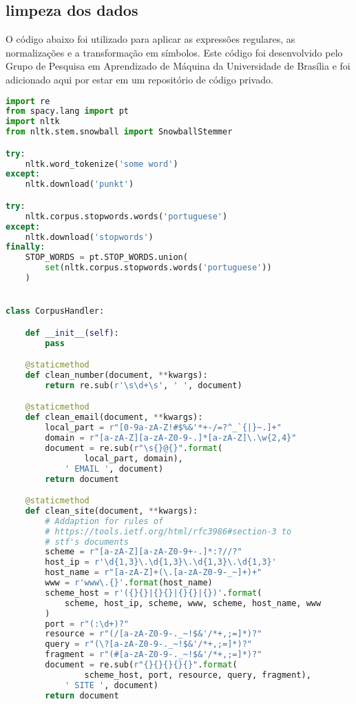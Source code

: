 \begin{apendicesenv}

\partapendices
\chapter{limpeza dos dados}
\label{sec:apendiceA}

O código abaixo foi utilizado para aplicar as expressões regulares, as normalizações e a transformação em símbolos. Este código foi desenvolvido pelo Grupo de Pesquisa em Aprendizado de Máquina da Universidade de Brasília e foi adicionado aqui por estar em um repositório de código privado.

\begin{lstlisting}[language=Python,extendedchars=true]
import re
from spacy.lang import pt
import nltk
from nltk.stem.snowball import SnowballStemmer

try:
    nltk.word_tokenize('some word')
except:
    nltk.download('punkt')

try:
    nltk.corpus.stopwords.words('portuguese')
except:
    nltk.download('stopwords')
finally:
    STOP_WORDS = pt.STOP_WORDS.union(
        set(nltk.corpus.stopwords.words('portuguese'))
    )


class CorpusHandler:

    def __init__(self):
        pass

    @staticmethod
    def clean_number(document, **kwargs):
        return re.sub(r'\s\d+\s', ' ', document)

    @staticmethod
    def clean_email(document, **kwargs):
        local_part = r"[0-9a-zA-Z!#$%&'*+-/=?^_`{|}~.]+"
        domain = r"[a-zA-Z][a-zA-Z0-9-.]*[a-zA-Z]\.\w{2,4}"
        document = re.sub(r"\s{}@{}".format(
                local_part, domain),
            ' EMAIL ', document)
        return document

    @staticmethod
    def clean_site(document, **kwargs):
        # Addaption for rules of
        # https://tools.ietf.org/html/rfc3986#section-3 to
        # stf's documents
        scheme = r"[a-zA-Z][a-zA-Z0-9+-.]*:?//?"
        host_ip = r'\d{1,3}\.\d{1,3}\.\d{1,3}\.\d{1,3}'
        host_name = r"[a-zA-Z]+(\.[a-zA-Z0-9-_~]+)+"
        www = r'www\.{}'.format(host_name)
        scheme_host = r'({}{}|{}{}|{}{}|{})'.format(
            scheme, host_ip, scheme, www, scheme, host_name, www
        )
        port = r"(:\d+)?"
        resource = r"(/[a-zA-Z0-9-._~!$&'/*+,;=]*)?"
        query = r"(\?[a-zA-Z0-9-._~!$&'/*+,;=]*)?"
        fragment = r"(#[a-zA-Z0-9-._~!$&'/*+,;=]*)?"
        document = re.sub(r"{}{}{}{}{}".format(
                scheme_host, port, resource, query, fragment),
            ' SITE ', document)
        return document


\end{lstlisting}
\end{apendicesenv}

